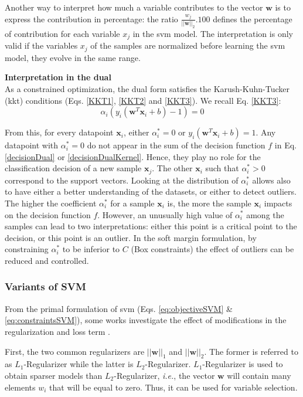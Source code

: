 Another way to interpret how much a variable contributes to the vector $\textbf{w}$ is to express the contribution in percentage: the ratio $\frac{w_j}{||\textbf{w}||_2} . 100$ defines the percentage of contribution for each variable $x_j$ in the {\sc svm} model. The interpretation is only valid if 
the variables $x_j$ of the samples are normalized before learning the {\sc svm} model, they evolve in the same range.



\noindent \textbf{Interpretation in the dual} \\
As a constrained optimization, the dual form satisfies the
Karush-Kuhn-Tucker ({\sc kkt}) conditions (Eqs. \ref{KKT1}, \ref{KKT2} and \ref{KKT3}). We recall Eq. \ref{KKT3}:
\begin{equation*}
	\alpha_i (y_i(\textbf{w}^T\textbf{x}_i+b)-1) = 0
\end{equation*}

From this, for every datapoint $\textbf{x}_i$, either $\alpha_i^* = 0$ or $y_i(\textbf{w}^T\textbf{x}_i+b) = 1$. Any datapoint with $\alpha_i^* = 0$ do not appear in the sum of the decision function $f$ in Eq. \ref{decisionDual} or \ref{decisionDualKernel}. Hence, they play no role for the classification decision of a new sample $\textbf{x}_j$. The other $\textbf{x}_i$ such that $\alpha_i^* > 0$ correspond to the support vectors. Looking at the distribution of $\alpha_i^*$ allows also to have either a better understanding of the datasets, or either to detect outliers. The higher the coefficient $\alpha_i^*$ for a sample $\textbf{x}_i$ is, the more the sample $\textbf{x}_i$ impacts on the decision function $f$. However, an unusually high value of $\alpha_i^*$ among the samples can lead to two interpretations: either this point is a critical point to the decision, or this point is an outlier. In the soft margin formulation, by constraining $\alpha_i^*$ to be inferior to $C$ (Box constraints) the effect of outliers can be reduced and controlled. 

\subsubsection{Variants of SVM}
From the primal formulation of {\sc svm} (Eqs. \ref{eq:objectiveSVM} \& \ref{eq:constraintsSVM}), some works investigate the effect of modifications in the regularization and loss term \cite{Hsu2008}.

First, the two common regularizers are $||\textbf{w}||_1$ and $||\textbf{w}||_2$. The former is referred to as $L_1$-Regularizer while the latter is $L_2$-Regularizer. $L_1$-Regularizer is used to obtain sparser models than $L_2$-Regularizer, \textit{i.e.}, the vector $\textbf{w}$ will contain many elements $w_i$ that will be equal to zero. Thus, it can be used for variable selection.

